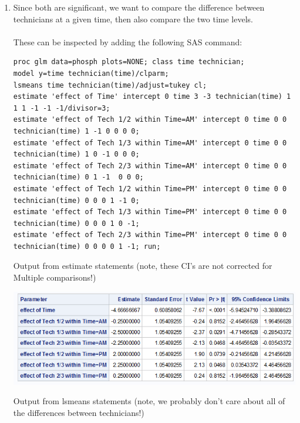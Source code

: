 \begin{enumerate}
\item Since both are significant, we want to compare the difference between technicians at a given time, then also compare the two time levels.  \\~\\
These can be inspected by adding the following SAS command:\\
\begin{small}
\begin{verbatim}
proc glm data=phosph plots=NONE; class time technician;
model y=time technician(time)/clparm;
lsmeans time technician(time)/adjust=tukey cl;
estimate 'effect of Time' intercept 0 time 3 -3 technician(time) 1 1 1 -1 -1 -1/divisor=3; 
estimate 'effect of Tech 1/2 within Time=AM' intercept 0 time 0 0 technician(time) 1 -1 0 0 0 0;
estimate 'effect of Tech 1/3 within Time=AM' intercept 0 time 0 0 technician(time) 1 0 -1 0 0 0;
estimate 'effect of Tech 2/3 within Time=AM' intercept 0 time 0 0 technician(time) 0 1 -1  0 0 0;
estimate 'effect of Tech 1/2 within Time=PM' intercept 0 time 0 0 technician(time) 0 0 0 1 -1 0;
estimate 'effect of Tech 1/3 within Time=PM' intercept 0 time 0 0 technician(time) 0 0 0 1 0 -1;
estimate 'effect of Tech 2/3 within Time=PM' intercept 0 time 0 0 technician(time) 0 0 0 0 1 -1; run;
\end{verbatim}
\end{small}

\newpage

Output from estimate statements (note, these CI's are not corrected for Multiple comparisons!)

\begin{center}
\includegraphics[scale=0.7]{NestedSAS5}
\end{center}


Output from lsmeans statements (note, we probably don't care about all of the differences between technicians!)


\end{enumerate}
